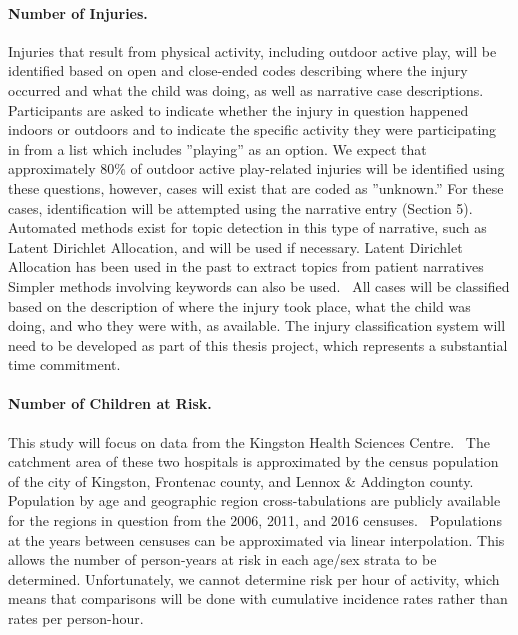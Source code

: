 \documentclass [11pt]{article}
\begin{document}
\paragraph{Number of Injuries.} Injuries that result from physical activity, including outdoor active play, will be identified based on open and close-ended codes describing where the injury occurred and what the child was doing, as well as narrative case descriptions. Participants are asked to indicate whether the injury in question happened indoors or outdoors and to indicate the specific activity they were participating in from a list which includes ''playing'' as an option. We expect that approximately 80\% of outdoor active play-related injuries will be identified using these questions, however, cases will exist that are coded as ''unknown.'' For these cases, identification will be attempted using the narrative entry (Section 5). Automated methods exist for topic detection in this type of narrative, such as Latent Dirichlet Allocation\cite{Blei2003-ob}, and will be used if necessary. Latent Dirichlet Allocation has been used in the past to extract topics from patient narratives \cite{Hassanali2013-va,Cohen2014-fd} Simpler methods involving keywords can also be used.~\cite{Fridman2013-wq} All cases will be classified based on the description of where the injury took place, what the child was doing, and who they were with, as available. The injury classification system will need to be developed as part of this thesis project, which represents a substantial time commitment.

\paragraph{Number of Children at Risk.} This study will focus on data from the Kingston Health Sciences Centre.~\cite{Pickett2003-zj} The catchment area of these two hospitals is approximated by the census population of the city of Kingston, Frontenac county, and Lennox \& Addington county.~\cite{Pickett2003-zj} Population by age and geographic region cross-tabulations are publicly available for the regions in question from the 2006, 2011, and 2016 censuses.~\cite{Government_of_Canada2007-zb,Government_of_Canada2017-iu} Populations at the years between censuses can be approximated via linear interpolation. This allows the number of person-years at risk in each age/sex strata to be determined. Unfortunately, we cannot determine risk per hour of activity, which means that comparisons will be done with cumulative incidence rates rather than rates per person-hour. 
\end{document}
